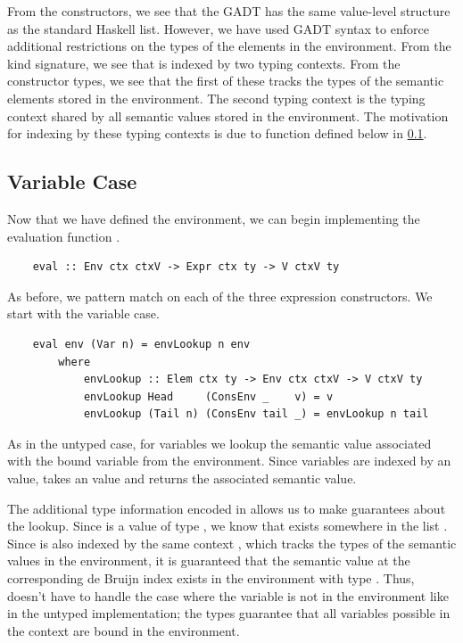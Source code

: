 From the constructors, we see that the  GADT has the same value-level structure as the standard Haskell list. However, we have used GADT syntax to enforce additional restrictions on the types of the elements in the environment. From the kind signature, we see that  is indexed by two typing contexts. From the constructor types, we see that the first of these tracks the types of the semantic elements stored in the environment. The second typing context is the typing context shared by all semantic values stored in the environment. The motivation for indexing  by these typing contexts is due to  function defined below in \ref{subsect:typedetaExpandCase}.



\subsection{Variable Case}
\label{subsect:typedetaExpandCase}

Now that we have defined the environment, we can begin implementing the evaluation function .

\begin{lstlisting}
    eval :: Env ctx ctxV -> Expr ctx ty -> V ctxV ty
\end{lstlisting}

As before, we pattern match on each of the three expression constructors. We start with the variable case.

\begin{lstlisting}
    eval env (Var n) = envLookup n env
        where
            envLookup :: Elem ctx ty -> Env ctx ctxV -> V ctxV ty 
            envLookup Head     (ConsEnv _    v) = v
            envLookup (Tail n) (ConsEnv tail _) = envLookup n tail
\end{lstlisting}

As in the untyped case, for variables we lookup the semantic value associated with the bound variable from the environment. Since variables are indexed by an  value,  takes an  value and returns the associated semantic value.

The additional type information encoded in  allows us to make guarantees about the lookup. Since  is a value of type , we know that  exists somewhere in the list . Since  is also indexed by the same context , which tracks the types of the semantic values in the environment, it is guaranteed that the semantic value at the corresponding de Bruijn index exists in the environment with type . Thus,  doesn't have to handle the case where the variable is not in the environment like in the untyped implementation; the types guarantee that all variables possible in the context  are bound in the environment.

